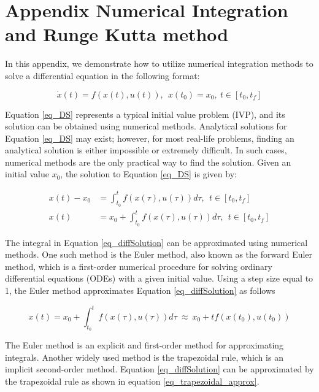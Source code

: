 \documentclass  [
  paper    = a4,
  BCOR     = 10mm,
  twoside,
  fontsize = 12pt,
  fleqn,
  toc      = bibnumbered,
  toc      = listofnumbered,
  numbers  = noendperiod,
  headings = normal,
  listof   = leveldown,
  version  = 3.03
]                                       {scrreprt}
\newcommand{\<}{\langle}
\renewcommand{\>}{\rangle}
\begin{document}
\appendix
\chapter{Appendix  Numerical Integration and Runge Kutta method}
 \label{App1}
  	
In this appendix, we demonstrate how to utilize numerical integration methods to solve a differential equation in the following format:

\begin{equation}
	\dot{x}(t) = f(x(t), u(t)), \ \ x(t_0) = x_0, \ t \in [t_0, t_f]
	\label{eq_DS}
\end{equation}

Equation \ref{eq_DS} represents a typical initial value problem (IVP), and its solution can be obtained using numerical methods. Analytical solutions for Equation \ref{eq_DS} may exist; however, for most real-life problems, finding an analytical solution is either impossible or extremely difficult. In such cases, numerical methods are the only practical way to find the solution. Given an initial value $x_0$, the solution to Equation \ref{eq_DS} is given by:

\begin{equation}\label{eq_diffSolution}
	\begin{aligned}
		x(t) - x_0 &= \int_{t_0}^{t} f(x(\tau), u(\tau)) d \tau, \ \ t \in [t_0, t_f] \\
		x(t) & = x_0 + \int_{t_0}^{t} f(x(\tau), u(\tau)) d \tau, \ \ t \in [t_0, t_f]
	\end{aligned}
\end{equation}

The integral in Equation \ref{eq_diffSolution} can be approximated using numerical methods. One such method is the Euler method, also known as the forward Euler method, which is a first-order numerical procedure for solving ordinary differential equations (ODEs) with a given initial value. Using a step size equal to 1, the Euler method approximates Equation \ref{eq_diffSolution} as follows

\begin{equation}
  	x(t)  = x_0  + \int_{t_0}^{t}  f(x(\tau), u(\tau)) d \tau \ \approx \   x_0  + t f(x(t_0), u(t_0))
  	\label{eq_Euler_approx}
\end{equation}
  	
The Euler method is an explicit and first-order method for approximating integrals. Another widely used method is the trapezoidal rule, which is an implicit second-order method. Equation \ref{eq_diffSolution} can be approximated by the trapezoidal rule as shown in equation \ref{eq_trapezoidal_approx}. 
\end{document}
